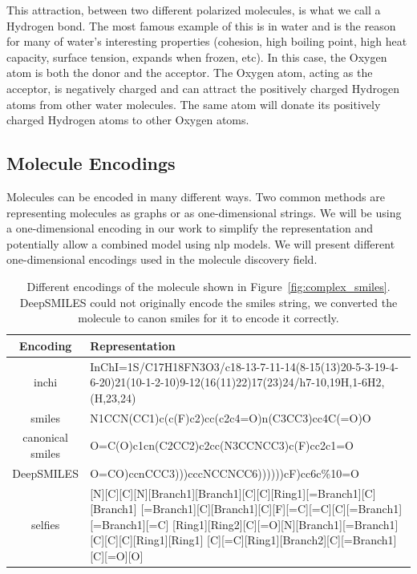 \documentclass[../Document.tex]{subfiles}
\begin{document}
This attraction, between two different polarized molecules, is what we call a Hydrogen bond. The most famous example of this is in water and is the reason for many of water's interesting properties (cohesion, high boiling point, high heat capacity, surface tension, expands when frozen, etc). In this case, the Oxygen atom is both the donor and the acceptor. The Oxygen atom, acting as the acceptor, is negatively charged and can attract the positively charged Hydrogen atoms from other water molecules. The same atom will donate its positively charged Hydrogen atoms to other Oxygen atoms.


\subsection{Molecule Encodings}
Molecules can be encoded in many different ways. Two common methods are representing molecules as graphs or as one-dimensional strings.
We will be using a one-dimensional encoding in our work to simplify the representation and potentially allow a combined model using \gls{nlp} models.
We will present different one-dimensional encodings used in the molecule discovery field.


\begin{table}[t]
    \centering
    \begin{tabular}{|c|p{5in}|}
        \hline
        Encoding & Representation \\
        \hline
        \acrshort{inchi} & InChI=1S/C17H18FN3O3/c18-13-7-11-14(8-15(13)20-5-3-19-4-6-20)21(10-1-2-10)9-12(16(11)22)17(23)24/h7-10,19H,1-6H2,(H,23,24)\\
        \hline
        \acrshort{smiles} & 
        N1CCN(CC1)c(c(F)c2)cc(c2c4=O)n(C3CC3)cc4C(=O)O
        \\
        \hline
        canonical \acrshort{smiles} & O=C(O)c1cn(C2CC2)c2cc(N3CCNCC3)c(F)cc2c1=O\\
        \hline
        DeepSMILES & O=CO)ccnCCC3)))cccNCCNCC6))))))cF)cc6c\%10=O\\
        \hline
        \acrshort{selfies} & [N][C][C][N][Branch1][Branch1][C][C][Ring1][=Branch1][C][Branch1]
        [=Branch1][C][Branch1][C][F][=C][=C][C][=Branch1][=Branch1][=C]
        [Ring1][Ring2][C][=O][N][Branch1][=Branch1][C][C][C][Ring1][Ring1]
        [C][=C][Ring1][Branch2][C][=Branch1][C][=O][O]\\
        \hline
    \end{tabular}
    \caption[Different encodings of the molecule shown in Figure~\ref{fig:complex_smiles}]{Different encodings of the molecule shown in Figure~\ref{fig:complex_smiles}. DeepSMILES could not originally encode the \gls{smiles} string, we converted the molecule to canon \gls{smiles} for it to encode it correctly.}
    \label{tab:different_encodings}
\end{table}
\end{document}
